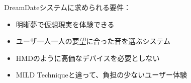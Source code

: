 DreamDateシステムに求められる要件：
\begin{itemize}
\item 明晰夢で仮想現実を体験できる
\item ユーザ一人一人の要望に合った音を選ぶシステム
\item HMDのように高価なデバイスを必要としない
\item MILD Techniqueと違って、負担の少ないユーザー体験
\end{itemize}

　
　